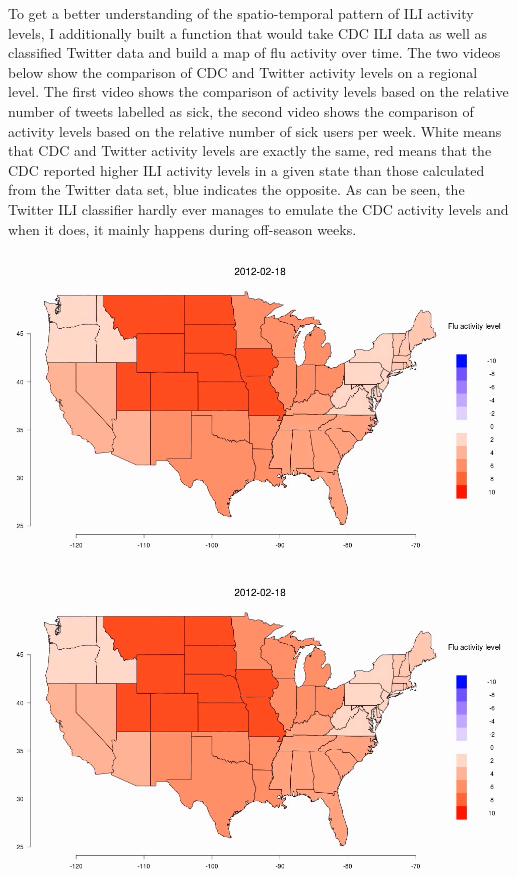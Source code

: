 \documentclass[11pt, a4paper,twoside]{report}\usepackage[]{graphicx}\usepackage[]{color}
\begin{document}
To get a better understanding of the spatio-temporal pattern of ILI activity levels, I additionally built a function that would take CDC ILI data as well as classified Twitter data and build a map of flu activity over time. The two videos below show the comparison of CDC and Twitter activity levels on a regional level. The first video shows the comparison of activity levels based on the relative number of tweets labelled as sick, the second video shows the comparison of activity levels based on the relative number of sick users per week. White means that CDC and Twitter activity levels are exactly the same, red means that the CDC reported higher ILI activity levels in a given state than those calculated from the Twitter data set, blue indicates the opposite. As can be seen, the Twitter ILI classifier hardly ever manages to emulate the CDC activity levels and when it does, it mainly happens during off-season weeks.\newline

\centering \href{run:vids/regional_Twitter_cdc_diff_full_rel_sick.avi}{\includegraphics[scale=0.5]{vids/Screenshot_Movie.png}} 

\bigskip

\centering \href{run:vids/regional_Twitter_cdc_diff_full_rel_sick_user.avi}{\includegraphics[scale=0.5]{vids/Screenshot_Movie.png}} 
\end{document}
